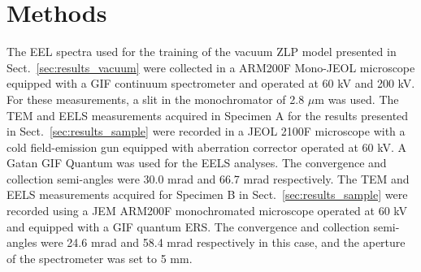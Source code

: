 \newpage
\section*{Methods}

{The EEL spectra used for the training of the vacuum ZLP model presented in Sect.~\ref{sec:results_vacuum} 
were collected in a ARM200F Mono-JEOL microscope equipped with a GIF continuum spectrometer and operated at 
60 kV and 200 kV. 
%
For these measurements, a slit in the monochromator of 2.8 $\mu$m was used.
%
The TEM and EELS measurements acquired in Specimen A for the results presented in
Sect.~\ref{sec:results_sample} were recorded in a JEOL 2100F microscope with a cold field-emission
gun equipped with aberration corrector operated at 60 kV. A Gatan GIF Quantum was used for
the EELS analyses. The convergence and collection semi-angles were 30.0 mrad and 66.7 mrad respectively.
%
The TEM and EELS measurements acquired for Specimen B in Sect.~\ref{sec:results_sample}
were recorded using a JEM ARM200F monochromated microscope operated at 60 kV and equipped with
a GIF quantum ERS. The convergence and collection semi-angles were 24.6 mrad and 58.4 mrad respectively
in this case, and the aperture of the spectrometer was set to 5 mm.}


